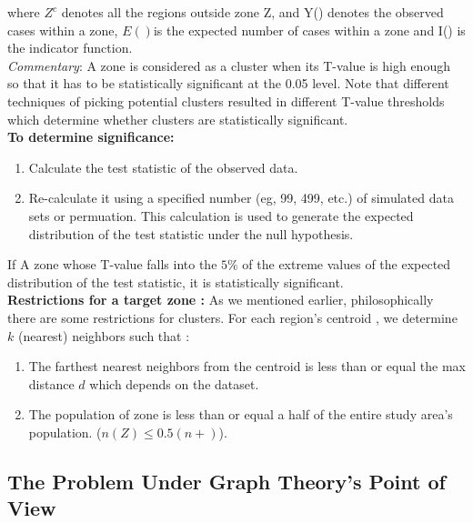 \documentclass[12pt]{article}
\begin{document}
				where $ Z^c$ denotes all the regions outside zone Z, and Y() denotes the observed cases within a zone, $E()$is the expected number of cases within a zone and I() is the indicator function. \\ 
			
			 \textit{Commentary}: A zone is considered as a cluster when its T-value is high enough so that it has to be statistically significant at the 0.05 level. Note that different techniques of picking potential clusters resulted in different T-value thresholds which determine whether clusters are statistically significant. \\
			 
			 \textbf{To determine significance:} \\
			 \begin{enumerate}
			 \item Calculate the test statistic of the observed data.	
			 \item Re-calculate it using a specified number (eg, 99, 499, etc.) of simulated data sets or permuation. This calculation is used to generate the expected distribution of the test statistic under the null hypothesis. 
			 \end{enumerate}
			 If A zone whose T-value falls into the $5\%$ of the extreme values of the expected distribution of the test statistic, it is statistically significant. \\
			
			\textbf{Restrictions for a target zone : } As we mentioned earlier, philosophically there are some restrictions for clusters. For each region's centroid , we determine $k$ (nearest) neighbors such that : \\
				\begin{enumerate}
					\item The farthest nearest neighbors from the centroid is less than or equal the max distance $d$ which depends on the dataset. \\ 
					\item The population of zone is less than or equal a half of the entire study area's population. ($n(Z) \leq 0.5(n+)$).\\
				\end{enumerate}
			
				\subsection{The Problem Under Graph Theory's Point of View} 
				
\end{document}

